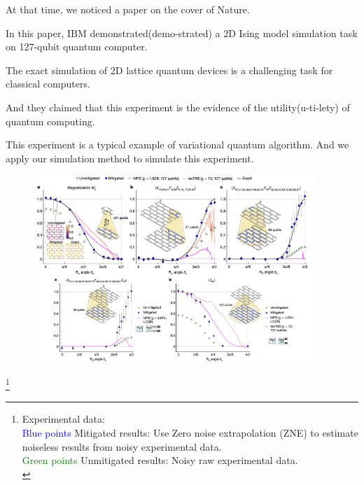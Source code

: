 \documentclass[10pt]{beamer}
\begin{document}
\begin{CJK}{UTF8}{gbsn}
{  At that time, we noticed a paper on the cover of Nature.

In this paper, IBM demonstrated(demo-strated) a 2D Ising model simulation task on 127-qubit quantum computer. 

The exact simulation of 2D lattice quantum devices is a challenging task for classical computers.

And they claimed that this experiment is the evidence of the utility(u-ti-lety) of quantum computing.

This experiment is a typical example of variational quantum algorithm.
And we apply our simulation method to simulate this experiment.
   
 
 
 }

 \begin{frame}[fragile]
   \begin{figure}
     \centering
     \includegraphics[width=0.95\textwidth]{fig/ibm4.png}
   \end{figure}
   \vspace{-1em}
   \footnote{Experimental data:\\
    \textcolor{blue}{Blue points} Mitigated results: Use Zero noise extrapolation (ZNE) to estimate noiseless results from noisy experimental data.\\
  \textcolor{green}{Green points} Unmitigated results: Noisy raw experimental data.\\}
 \end{frame}
 \note{\scriptsize

}
\end{CJK}
\end{document}
